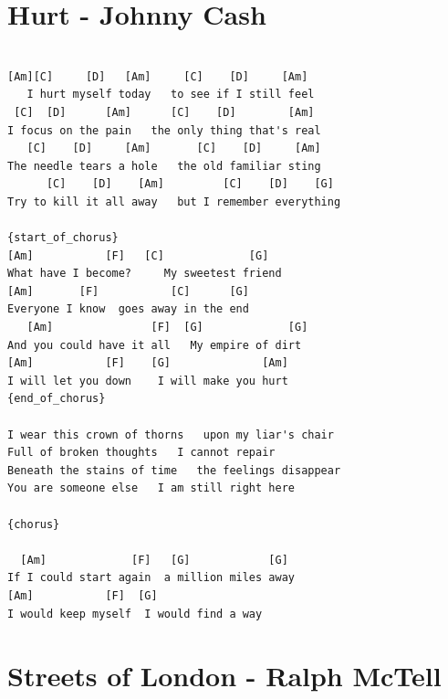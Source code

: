 \documentclass[
]{book}
\let\stdsection\section
\renewcommand\section{\clearpage\stdsection}
\begin{document}
\hypertarget{hurt---johnny-cash}{%
\section{Hurt - Johnny Cash}\label{hurt---johnny-cash}}

\begin{verbatim}

[Am][C]     [D]   [Am]     [C]    [D]     [Am]
   I hurt myself today   to see if I still feel
 [C]  [D]      [Am]      [C]    [D]        [Am]
I focus on the pain   the only thing that's real
   [C]    [D]     [Am]       [C]    [D]     [Am]
The needle tears a hole   the old familiar sting
      [C]    [D]    [Am]         [C]    [D]    [G]         
Try to kill it all away   but I remember everything

{start_of_chorus}
[Am]           [F]   [C]             [G]
What have I become?     My sweetest friend
[Am]       [F]           [C]      [G]
Everyone I know  goes away in the end
   [Am]               [F]  [G]             [G]
And you could have it all   My empire of dirt
[Am]           [F]    [G]              [Am]
I will let you down    I will make you hurt
{end_of_chorus}

I wear this crown of thorns   upon my liar's chair
Full of broken thoughts   I cannot repair
Beneath the stains of time   the feelings disappear
You are someone else   I am still right here

{chorus}

  [Am]             [F]   [G]            [G]
If I could start again  a million miles away
[Am]           [F]  [G]
I would keep myself  I would find a way
\end{verbatim}

\hypertarget{streets-of-london---ralph-mctell}{%
\section{Streets of London - Ralph McTell}\label{streets-of-london---ralph-mctell}}
\end{document}
